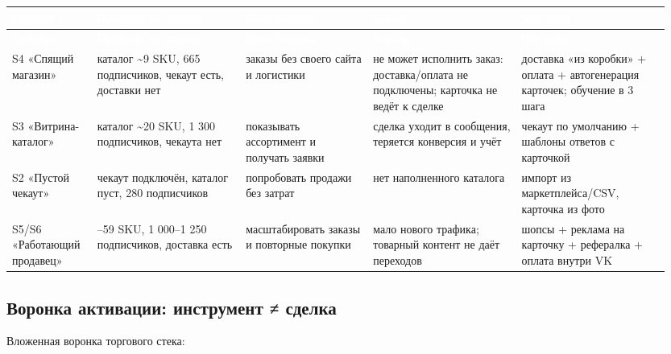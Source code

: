 \documentclass[10pt,a4paper]{article}
\begin{document}
\begingroup
\footnotesize
\setlength{\tabcolsep}{3pt}
\renewcommand{\arraystretch}{1.12}
\begin{longtable}{@{}>{\raggedright\arraybackslash}p{0.1246\linewidth}>{\raggedright\arraybackslash}p{0.2123\linewidth}>{\raggedright\arraybackslash}p{0.1892\linewidth}>{\raggedright\arraybackslash}p{0.2123\linewidth}>{\raggedright\arraybackslash}p{0.2123\linewidth}@{}}
\rowcolor{blue}
\textcolor{white}{\textbf{Сегмент}} & \textcolor{white}{\textbf{Профиль из данных}} & \textcolor{white}{\textbf{Цель бизнеса}} & \textcolor{white}{\textbf{Барьер}} & \textcolor{white}{\textbf{Что даём}} \\
\endfirsthead
\rowcolor{blue}
\textcolor{white}{\textbf{Сегмент}} & \textcolor{white}{\textbf{Профиль из данных}} & \textcolor{white}{\textbf{Цель бизнеса}} & \textcolor{white}{\textbf{Барьер}} & \textcolor{white}{\textbf{Что даём}} \\
\endhead
\hline
S4 «Спящий магазин» & каталог \textasciitilde{}9 SKU, 665 подписчиков, чекаут есть, доставки нет & заказы без своего сайта и логистики & не может исполнить заказ: доставка/оплата не подключены; карточка не ведёт к сделке & доставка «из коробки» + оплата + автогенерация карточек; обучение в 3 шага \\
S3 «Витрина-каталог» & каталог \textasciitilde{}20 SKU, 1 300 подписчиков, чекаута нет & показывать ассортимент и получать заявки & сделка уходит в сообщения, теряется конверсия и учёт & чекаут по умолчанию + шаблоны ответов с карточкой \\
S2 «Пустой чекаут» & чекаут подключён, каталог пуст, 280 подписчиков & попробовать продажи без затрат & нет наполненного каталога & импорт из маркетплейса/CSV, карточка из фото \\
S5/S6 «Работающий продавец» & 39–59 SKU, 1 000–1 250 подписчиков, доставка есть & масштабировать заказы и повторные покупки & мало нового трафика; товарный контент не даёт переходов & шопсы + реклама на карточку + рефералка + оплата внутри VK \\
\hline
\end{longtable}
\endgroup
\vspace{4pt}

\subsection{Воронка активации: инструмент ≠ сделка}

Вложенная воронка торгового стека:\par
\end{document}

